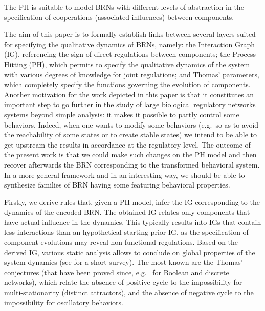 The PH is suitable to model BRNs with different levels of abstraction in the specification of
cooperations (associated influences) between components.   

\medskip

The aim of this paper is to formally establish links between several layers suited for specifying the
qualitative dynamics of BRNs, namely:
the Interaction Graph (IG), referencing the sign of direct regulations between components;
the Process Hitting (PH), which permits to specify the qualitative dynamics of the system with
various degrees of knowledge for joint regulations;
and Thomas' parameters, which completely specify the functions governing the evolution of
components.
Another motivation for the work depicted in this paper is that it constitutes an important step
to go further in the study of large biological regulatory networks systems beyond simple analysis:
it makes it possible to partly control some behaviors.
Indeed, when one wants to modify some behaviors
(e.g.~so as to avoid the reachability of some states or to create stable states)
we intend to be able to get upstream the results in accordance at the regulatory level.
The outcome of the present work is that we could make such changes on the PH model
and then recover afterwards the BRN corresponding to the transformed behavioral system.
In a more general framework and in an interesting way,
we should be able to synthesize families of BRN having some featuring behavioral properties.

Firstly, we derive rules that, given a PH model, infer the IG corresponding to the dynamics of the
encoded BRN.
The obtained IG relates only components that have actual influence in the dynamics.
This typically results into IGs that contain less interactions than an hypothetical starting prior
IG, as the specification of component evolutions may reveal non-functional regulations.
Based on the derived IG, various static analysis allows to conclude on global properties
of the system dynamics (see \cite{PR11-SASB} for a short survey).
The most known are the Thomas' conjectures (that have been proved since,
e.g.~\cite{RRT08,RiCo07,Richard2010378}
for Boolean and discrete networks),
which relate the absence of
positive cycle to the impossibility for multi-stationarity (distinct attractors),
and the absence of negative cycle to the impossibility for oscillatory behaviors.

